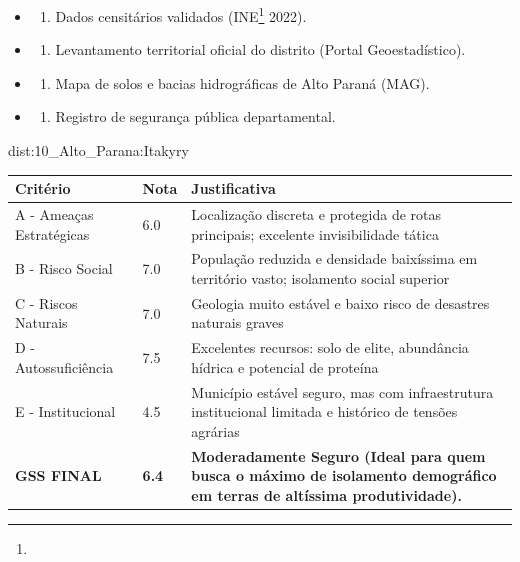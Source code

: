{\begin{itemize}
\tightlist
\item
  \begin{enumerate}
  \def\labelenumi{\arabic{enumi})}
  \tightlist
  \item
    Dados censitários validados (INE\footnote{\fineINE} 2022).
  \end{enumerate}
\item
  \begin{enumerate}
  \def\labelenumi{\arabic{enumi})}
  \setcounter{enumi}{1}
  \tightlist
  \item
    Levantamento territorial oficial do distrito (Portal
    Geoestadístico).
  \end{enumerate}
\item
  \begin{enumerate}
  \def\labelenumi{\arabic{enumi})}
  \setcounter{enumi}{2}
  \tightlist
  \item
    Mapa de solos e bacias hidrográficas de Alto Paraná (MAG).
  \end{enumerate}
\item
  \begin{enumerate}
  \def\labelenumi{\arabic{enumi})}
  \setcounter{enumi}{3}
  \tightlist
  \item
    Registro de segurança pública departamental.
  \end{enumerate}
\end{itemize}}{dist:10_Alto_Parana:Itakyry}
\begin{table}[ht!]
\small \begin{tabular}{p{3.0cm}p{0.8cm}p{6.0cm}} \toprule
\textbf{Critério} & \textbf{Nota} & \textbf{Justificativa} \\ \midrule
A - Ameaças Estratégicas & 6.0 & Localização discreta e protegida de rotas principais; excelente invisibilidade tática \\
B - Risco Social & 7.0 & População reduzida e densidade baixíssima em território vasto; isolamento social superior \\
C - Riscos Naturais & 7.0 & Geologia muito estável e baixo risco de desastres naturais graves \\
D - Autossuficiência & 7.5 & Excelentes recursos: solo de elite, abundância hídrica e potencial de proteína \\
E - Institucional & 4.5 & Município estável seguro, mas com infraestrutura institucional limitada e histórico de tensões agrárias \\
\midrule \textbf{GSS FINAL} & \textbf{6.4} & \textbf{Moderadamente Seguro (Ideal para quem busca o máximo de isolamento demográfico em terras de altíssima produtividade).} \\ \bottomrule \end{tabular}
\end{table}
